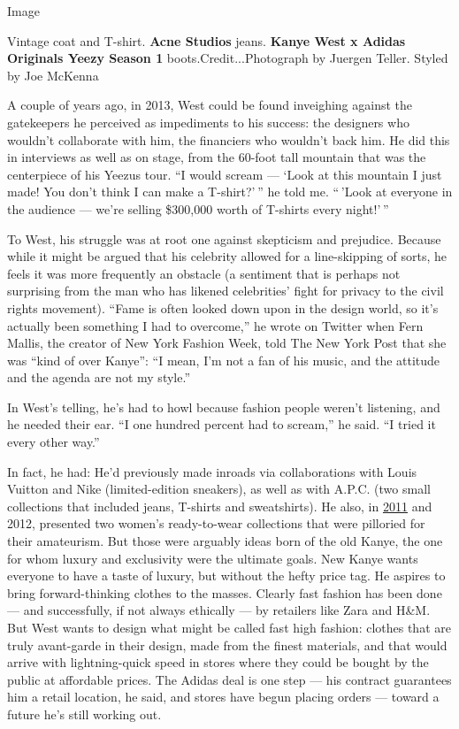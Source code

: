 Image

Vintage coat and T-shirt. \textbf{Acne Studios} jeans. \textbf{Kanye
West x Adidas Originals Yeezy Season 1} boots.Credit...Photograph by
Juergen Teller. Styled by Joe McKenna

A couple of years ago, in 2013, West could be found inveighing against
the gatekeepers he perceived as impediments to his success: the
designers who wouldn't collaborate with him, the financiers who wouldn't
back him. He did this in interviews as well as on stage, from the
60-foot tall mountain that was the centerpiece of his Yeezus tour. ``I
would scream --- `Look at this mountain I just made! You don't think I
can make a T-shirt?' '' he told me. `` 'Look at everyone in the audience
--- we're selling \$300,000 worth of T-shirts every night!' ''

To West, his struggle was at root one against skepticism and prejudice.
Because while it might be argued that his celebrity allowed for a
line-skipping of sorts, he feels it was more frequently an obstacle (a
sentiment that is perhaps not surprising from the man who has likened
celebrities' fight for privacy to the civil rights movement). ``Fame is
often looked down upon in the design world, so it's actually been
something I had to overcome,'' he wrote on Twitter when Fern Mallis, the
creator of New York Fashion Week, told The New York Post that she was
``kind of over Kanye'': ``I mean, I'm not a fan of his music, and the
attitude and the agenda are not my style.''

In West's telling, he's had to howl because fashion people weren't
listening, and he needed their ear. ``I one hundred percent had to
scream,'' he said. ``I tried it every other way.''

In fact, he had: He'd previously made inroads via collaborations with
Louis Vuitton and Nike (limited-edition sneakers), as well as with
A.P.C. (two small collections that included jeans, T-shirts and
sweatshirts). He also, in
\href{http://runway.blogs.nytimes3xbfgragh.onion/2011/10/01/kanye-west-show-shrouded-in-silence-creates-a-scene/}{2011}
and 2012, presented two women's ready-to-wear collections that were
pilloried for their amateurism. But those were arguably ideas born of
the old Kanye, the one for whom luxury and exclusivity were the ultimate
goals. New Kanye wants everyone to have a taste of luxury, but without
the hefty price tag. He aspires to bring forward-thinking clothes to the
masses. Clearly fast fashion has been done --- and successfully, if not
always ethically --- by retailers like Zara and H\&M. But West wants to
design what might be called fast high fashion: clothes that are truly
avant-garde in their design, made from the finest materials, and that
would arrive with lightning-quick speed in stores where they could be
bought by the public at affordable prices. The Adidas deal is one step
--- his contract guarantees him a retail location, he said, and stores
have begun placing orders --- toward a future he's still working out.

